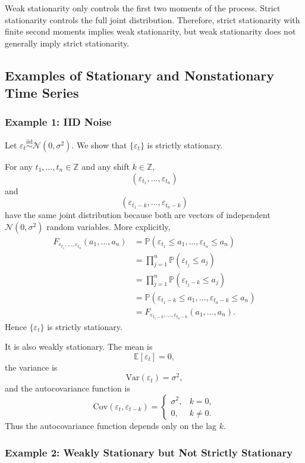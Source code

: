 \documentclass[12pt,oneside]{book}
\numberwithin{equation}{section}
\theoremstyle{definition}
\theoremstyle{plain}
\theoremstyle{remark}
\newcommand{\Z}{\mathbb{Z}}
\newcommand{\E}{\mathbb{E}}
\newcommand{\Var}{\mathrm{Var}}
\newcommand{\Cov}{\mathrm{Cov}}
\newcommand{\Prob}{\mathbb{P}}
\newcommand{\iid}{\overset{\text{iid}}{\sim}}
\newcommand{\Normal}{\mathcal{N}}
\begin{document}
Weak stationarity only controls the first two moments of the process. Strict stationarity controls the full joint distribution. Therefore, strict stationarity with finite second moments implies weak stationarity, but weak stationarity does not generally imply strict stationarity.

\subsection{Examples of Stationary and Nonstationary Time Series}

\subsubsection{Example 1: IID Noise}

Let $\varepsilon_t \iid \Normal(0,\sigma^2)$. We show that $\{\varepsilon_t\}$ is strictly stationary.

For any $t_1,\ldots,t_n\in\Z$ and any shift $k\in\Z$,
\[
(\varepsilon_{t_1},\ldots,\varepsilon_{t_n})
\]
and
\[
(\varepsilon_{t_1-k},\ldots,\varepsilon_{t_n-k})
\]
have the same joint distribution because both are vectors of independent $\Normal(0,\sigma^2)$ random variables. More explicitly,
\begin{align*}
F_{\varepsilon_{t_1},\ldots,\varepsilon_{t_n}}(a_1,\ldots,a_n)
&=
\Prob(\varepsilon_{t_1}\leq a_1,\ldots,\varepsilon_{t_n}\leq a_n) \\
&=
\prod_{j=1}^n \Prob(\varepsilon_{t_j}\leq a_j) \\
&=
\prod_{j=1}^n \Prob(\varepsilon_{t_j-k}\leq a_j) \\
&=
\Prob(\varepsilon_{t_1-k}\leq a_1,\ldots,\varepsilon_{t_n-k}\leq a_n) \\
&=
F_{\varepsilon_{t_1-k},\ldots,\varepsilon_{t_n-k}}(a_1,\ldots,a_n).
\end{align*}
Hence $\{\varepsilon_t\}$ is strictly stationary.

It is also weakly stationary. The mean is
\[
\E[\varepsilon_t]=0,
\]
the variance is
\[
\Var(\varepsilon_t)=\sigma^2,
\]
and the autocovariance function is
\[
\Cov(\varepsilon_t,\varepsilon_{t-k})
=
\begin{cases}
\sigma^2, & k=0,\\
0, & k\neq 0.
\end{cases}
\]
Thus the autocovariance function depends only on the lag $k$.

\subsubsection{Example 2: Weakly Stationary but Not Strictly Stationary}
\end{document}
